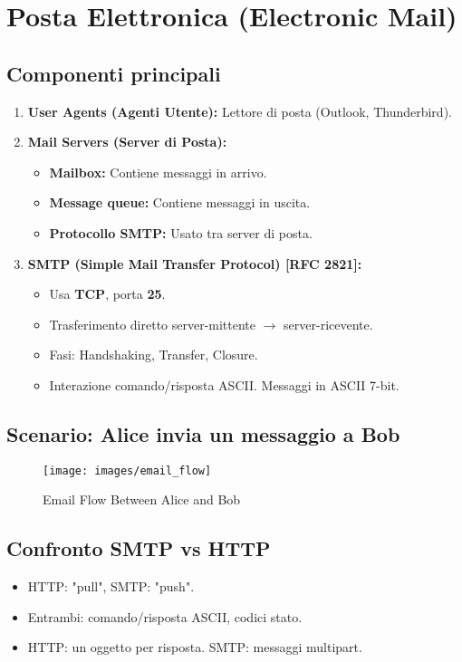 \section{Posta Elettronica (Electronic Mail)}
\subsection{Componenti principali}
\begin{enumerate}
    \item \textbf{User Agents (Agenti Utente):} Lettore di posta (Outlook, Thunderbird).
    \item \textbf{Mail Servers (Server di Posta):}
    \begin{itemize}
        \item \textbf{Mailbox:} Contiene messaggi in arrivo.
        \item \textbf{Message queue:} Contiene messaggi in uscita.
        \item \textbf{Protocollo SMTP:} Usato tra server di posta.
    \end{itemize}
    \item \textbf{SMTP (Simple Mail Transfer Protocol) [RFC 2821]:}
    \begin{itemize}
        \item Usa \textbf{TCP}, porta \textbf{25}.
        \item Trasferimento diretto server-mittente $\rightarrow$ server-ricevente.
        \item Fasi: Handshaking, Transfer, Closure.
        \item Interazione comando/risposta ASCII. Messaggi in ASCII 7-bit.
    \end{itemize}
\end{enumerate}

\subsection{Scenario: Alice invia un messaggio a Bob}
\begin{figure}[H]
\centering
\texttt{[image: images/email\_flow]}
\caption{Email Flow Between Alice and Bob}
\end{figure}

\subsection{Confronto SMTP vs HTTP}
\begin{itemize}
    \item HTTP: "pull", SMTP: "push".
    \item Entrambi: comando/risposta ASCII, codici stato.
    \item HTTP: un oggetto per risposta. SMTP: messaggi multipart.
\end{itemize}

